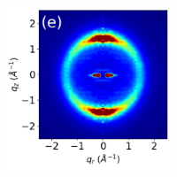 \documentclass[journal=jpcbfk,manuscript=article]{achemso}
\begin{document}
\begin{figure}[!htb]
\begin{subfigure}{0.905\textwidth}
\begin{subfigure}{0.28\linewidth}
\begin{subfigure}{\textwidth}
			\end{subfigure}
			
			\begin{subfigure}{\textwidth}
				\centering
			    \includegraphics[width=\linewidth]{rzplot_offset_300K_disorder_jet_nocbar.pdf}
			\end{subfigure}
	\end{subfigure}
	\end{subfigure}
	\begin{subfigure}{0.085\textwidth}
		\centering

\end{subfigure}
\end{figure}
\end{document}
